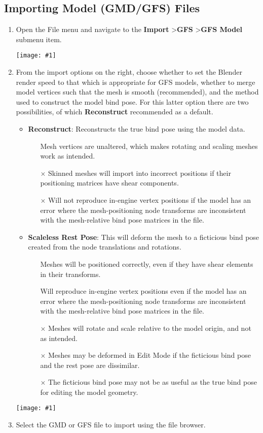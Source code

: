 \documentclass{article}
\newcommand{\greencheck}{{\color{green}\checkmark}}
\newcommand{\redcross}{{\color{red}$\times$}}
\newenvironment{guide}[1]
{
	\begin{center}
		\begin{tcolorbox}[%
			colback=black!20, 
			boxrule=0pt, 
			title=Step-by-step: #1,
			enhanced,
			breakable,
			overlay unbroken={%
                \draw[line width=1pt, black, rounded corners]
        	    (frame.north west) rectangle (frame.south east);
			},
    		overlay first={%
        		 \draw[line width=1pt, black, rounded corners]
        	    (frame.south west) -- (frame.north west) -- (frame.north east) -- (frame.south east);
                \draw[line width=1pt, black]
                (frame.south west) -- (frame.south east);
            },
    		overlay middle={%
                \draw[line width=1pt, black]
        	    (frame.north west) rectangle (frame.south east);
        	},
    		overlay last={%
                \draw[line width=1pt, black, rounded corners]
        	    (frame.north west) -- (frame.south west) -- (frame.south east) -- (frame.north east);
                \draw[line width=1pt, black]
                (frame.north west) -- (frame.north east);
           	}
        ]{}
    	\begin{enumerate}
}
{
    		\end{enumerate}
    	\end{tcolorbox}
	\end{center}  	 
}
\newcommand{\guideimage}[1]
{
	\begin{center}
		\texttt{[image: \#1]}
	\end{center}
}
\begin{document}
\subsection{Importing Model (GMD/GFS) Files}
\begin{guide}{Accessing the Model Import Menu}
\item Open the File menu and navigate to the \textbf{Import} \textgreater\space \textbf{GFS} \textgreater\space \textbf{GFS Model} submenu item.
\guideimage{images/import/import_gmd.png}
\item From the import options on the right, choose whether to set the Blender render speed to that which is appropriate for GFS models, whether to merge model vertices such that the mesh is smooth (recommended), and the method used to construct the model bind pose. For this latter option there are two possibilities, of which \textbf{Reconstruct} recommended as a default.
\begin{itemize}
\item \textbf{Reconstruct}: Reconstructs the true bind pose using the model data.
\begin{itemize}
\item[\greencheck] Mesh vertices are unaltered, which makes rotating and scaling meshes work as intended.
\item[\redcross] Skinned meshes will import into incorrect positions if their positioning matrices have shear components.
\item[\redcross] Will not reproduce in-engine vertex positions if the model has an error where the mesh-positioning node transforms are inconsistent with the mesh-relative bind pose matrices in the file.
\end{itemize}
\item \textbf{Scaleless Rest Pose}: This will deform the mesh to a ficticious bind pose created from the node translations and rotations. 
\begin{itemize}
\item[\greencheck] Meshes will be positioned correctly, even if they have shear elements in their transforms.
\item[\greencheck] Will reproduce in-engine vertex positions even if the model has an error where the mesh-positioning node transforms are inconsistent with the mesh-relative bind pose matrices in the file.
\item[\redcross] Meshes will rotate and scale relative to the model origin, and not as intended.
\item[\redcross] Meshes may be deformed in Edit Mode if the ficticious bind pose and the rest pose are dissimilar.
\item[\redcross] The ficticious bind pose may not be as useful as the true bind pose for editing the model geometry.
\end{itemize}
\end{itemize}
\guideimage{images/import/import_gmd_properties.png}
\item Select the GMD or GFS file to import using the file browser.
\end{guide}
\end{document}
